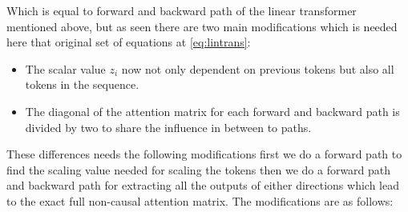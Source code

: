 Which is equal to \textcolor{blue!50}{forward} and \textcolor{red!50}{backward} path of the linear transformer mentioned above, but as seen there are two main modifications which is needed here that original set of equations at \ref{eq:lintrans}:
\begin{itemize}
    \item The scalar value $z_i$ now not only dependent on previous tokens but also all tokens in the sequence.
    \item The diagonal of the attention matrix for each forward and backward path is divided by two to share the influence in between to paths.
\end{itemize}
These differences needs the following modifications first we do a forward path to find the scaling value needed for scaling the tokens then we do a forward path and backward path for extracting all the outputs of either directions which lead to the exact full non-causal attention matrix. The modifications are as follows: 


